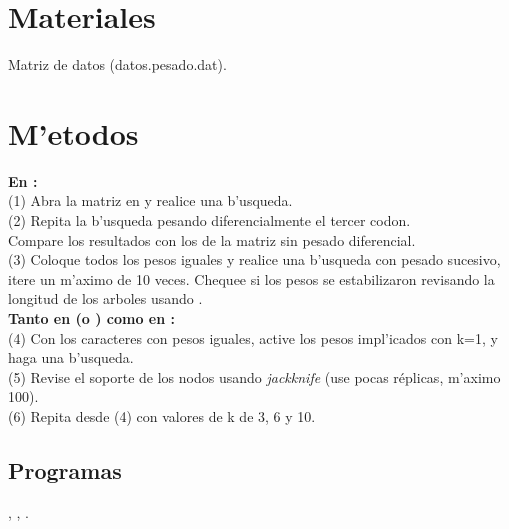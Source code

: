 \section{Materiales}
\noindent
Matriz de datos (datos.pesado.dat).

\section{M'etodos}
\noindent
\textbf{En :}\\
(1) Abra la matriz en  y realice una b'usqueda.\\
(2) Repita la b'usqueda pesando diferencialmente el tercer codon.\\
Compare los resultados con los de la matriz sin pesado diferencial.\\
(3) Coloque todos los pesos iguales y realice una b'usqueda con pesado sucesivo, itere un m'aximo de 10 veces. Chequee si los pesos se estabilizaron revisando la longitud de los arboles usando .\\
\textbf{Tanto en  (o ) como en :}\\
(4) Con los caracteres con pesos iguales, active los pesos impl'icados con k=1, y haga una b'usqueda.\\
(5) Revise el soporte de los nodos usando \textit{jackknife} (use pocas r\'eplicas, m'aximo 100).\\
(6) Repita desde (4) con valores de k de 3, 6 y 10.
\subsection{Programas}
\noindent
{}, , .\\
